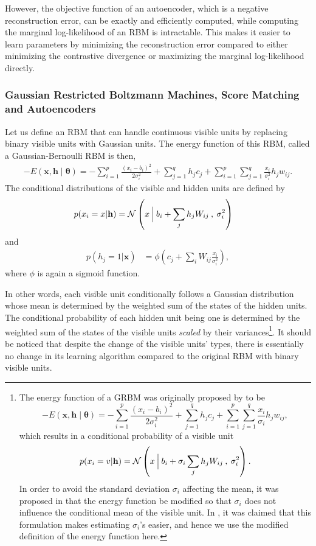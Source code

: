 \documentclass[dissertation,nocontribution,draft*]{aaltoseries}
\newcommand{\vect}[1]{\mathbf{#1}}
\newcommand{\vects}[1]{\boldsymbol{#1}}
\newcommand{\vh}[0]{\vect{h}}
\newcommand{\vx}[0]{\vect{x}}
\newcommand{\TT}[0]{{\vects{\theta}}}
\newcommand{\N}[0]{\mathcal{N}}
\begin{document}
However, the objective function of an autoencoder, which is
a negative reconstruction error, can be exactly and
efficiently computed, while computing the marginal
log-likelihood of an RBM is intractable. This makes it
easier to learn parameters by minimizing the reconstruction
error compared to either minimizing the contrastive
divergence or maximizing the marginal log-likelihood
directly.

\subsubsection{Gaussian Restricted Boltzmann Machines, Score
Matching and Autoencoders}
\label{sec:grbm}

Let us define an RBM that can handle continuous visible
units by replacing binary visible units with Gaussian units.
The energy function of this RBM, called a Gaussian-Bernoulli
RBM \citep[GRBM,][]{Hinton2006} is then,
\begin{align}
    \label{eq:grbm_energy}
    -E(\vx, \vh \mid \TT) = -\sum_{i=1}^p \frac{(x_i -
    b_i)^2}{2\sigma_i^2} + \sum_{j=1}^q h_j c_j +
    \sum_{i=1}^p \sum_{j=1}^q \frac{x_i}{\sigma_i^2} h_j
    w_{ij}.
\end{align}
The conditional distributions of the visible and hidden
units are defined by
\begin{align}
    \label{grbm:conditional_visible}
    p(x_i = x | \vh) &= \N \left(x \:\Bigl|\: b_i + 
    \sum_j h_j W_{ij} \:,\: \sigma_i^2 \right)
\end{align}
and
\begin{align}
    \label{grbm:conditional_hidden}
    p(h_j = 1 | \vx) &= \phi \left( c_j +  \sum_i W_{ij}
    \frac{x_i}{\sigma_i^2} \right),
\end{align}
where $\phi$ is again a sigmoid function.

In other words, each visible unit conditionally follows a
Gaussian distribution whose mean is determined by the
weighted sum of the states of the hidden units. The
conditional probability of each hidden unit being one is
determined by the weighted sum of the states of the visible
units \textit{scaled} by their variances\footnote{
The energy function of a GRBM was originally proposed by
\citet{Hinton2006} to be
\[
    -E(\vx, \vh \mid \TT) = -\sum_{i=1}^p \frac{(x_i -
    b_i)^2}{2\sigma_i^2} + \sum_{j=1}^q h_j c_j +
    \sum_{i=1}^p \sum_{j=1}^q \frac{x_i}{\sigma_i} h_j
    w_{ij},
\]
which results in a conditional probability of a visible unit 
\[
p(x_i = v | \vh) = \N \left(x \:\Bigl|\: b_i + 
\sigma_i \sum_j h_j W_{ij} \:,\: \sigma_i^2 \right).
\]
In order to avoid the standard deviation $\sigma_i$
affecting the mean, it was proposed in
 that the energy function be modified
so that $\sigma_i$ does not influence the conditional mean
of the visible unit.  In , it was
claimed that this formulation makes estimating $\sigma_i$'s
easier, and hence we use the modified definition of the energy
function here.
}.
It should be noticed that despite the change of the visible
units' types, there is essentially no change in its learning
algorithm compared to the original RBM with binary visible
units.
\end{document}

